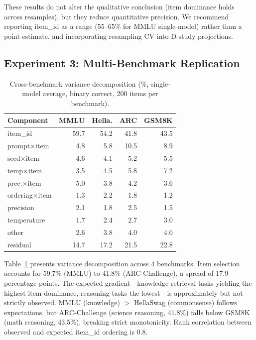 \documentclass[11pt,letterpaper]{article}
\begin{document}
These results do not alter the qualitative conclusion (item dominance holds across resamples), but they reduce quantitative precision.
We recommend reporting item\_id as a range (55--65\% for MMLU single-model) rather than a point estimate, and incorporating resampling CV into D-study projections.

\subsection{Experiment 3: Multi-Benchmark Replication}

\begin{table}[t]
\centering
\caption{Cross-benchmark variance decomposition (\%, single-model average, binary correct, 200 items per benchmark).}
\label{tab:cross_benchmark}
\small
\begin{tabular}{@{}lrrrr@{}}
\toprule
Component & MMLU & Hella. & ARC & GSM8K \\
\midrule
item\_id & 59.7 & 54.2 & 41.8 & 43.5 \\
prompt$\times$item & 4.8 & 5.8 & 10.5 & 8.9 \\
seed$\times$item & 4.6 & 4.1 & 5.2 & 5.5 \\
temp$\times$item & 3.5 & 4.5 & 5.8 & 7.2 \\
prec.$\times$item & 5.0 & 3.8 & 4.2 & 3.6 \\
ordering$\times$item & 1.3 & 2.2 & 1.8 & 1.2 \\
precision & 2.1 & 1.8 & 2.5 & 1.5 \\
temperature & 1.7 & 2.4 & 2.7 & 3.0 \\
other & 2.6 & 3.8 & 4.0 & 4.0 \\
residual & 14.7 & 17.2 & 21.5 & 22.8 \\
\bottomrule
\end{tabular}
\end{table}

Table~\ref{tab:cross_benchmark} presents variance decomposition across 4 benchmarks.
Item selection accounts for 59.7\% (MMLU) to 41.8\% (ARC-Challenge), a spread of 17.9 percentage points.
The expected gradient---knowledge-retrieval tasks yielding the highest item dominance, reasoning tasks the lowest---is approximately but not strictly observed.
MMLU (knowledge) $>$ HellaSwag (commonsense) follows expectations, but ARC-Challenge (science reasoning, 41.8\%) falls below GSM8K (math reasoning, 43.5\%), breaking strict monotonicity.
Rank correlation between observed and expected item\_id ordering is 0.8.
\end{document}

